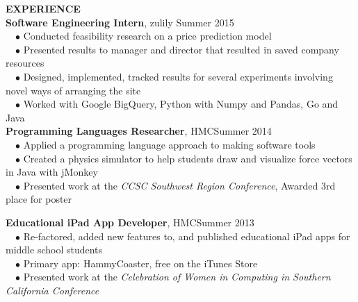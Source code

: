 \documentclass[11pt]{article}
\newcommand{\sectionNL}{\\[-2pt]}
\newcommand{\customtab}{$\hspace{10pt} \bullet \hspace{2pt}$}
\newcommand{\HMC}{HMC}
\newcommand{\rightAlign}{\hfill}
\begin{document}
\begin{flushleft}
{\textbf{EXPERIENCE}} \sectionNL

\textbf{Software Engineering Intern}, zulily \rightAlign Summer 2015 \\
\customtab Conducted feasibility research on a price prediction model \\
\customtab Presented results to manager and director that resulted in saved company resources \\
\customtab Designed, implemented, tracked results for several experiments involving novel ways of arranging the site \\
\customtab Worked with Google BigQuery, Python with Numpy and Pandas, Go and Java \\

\textbf{Programming Languages Researcher}, \HMC \rightAlign Summer 2014 \\
\customtab Applied a programming language approach to making software tools \\
\customtab Created a physics simulator to help students draw and visualize force vectors in Java with jMonkey\\
\customtab Presented work at the \textit{CCSC Southwest Region Conference}, Awarded 3rd place for poster 

\textbf{Educational iPad App Developer}, \HMC \rightAlign Summer 2013 \\
\customtab Re-factored, added new features to, and published educational iPad apps for middle school students \\
\customtab Primary app: HammyCoaster, free on the iTunes Store \\
\customtab Presented work at the \textit{Celebration of Women in Computing in Southern California Conference }
\end{flushleft}
\end{document}
